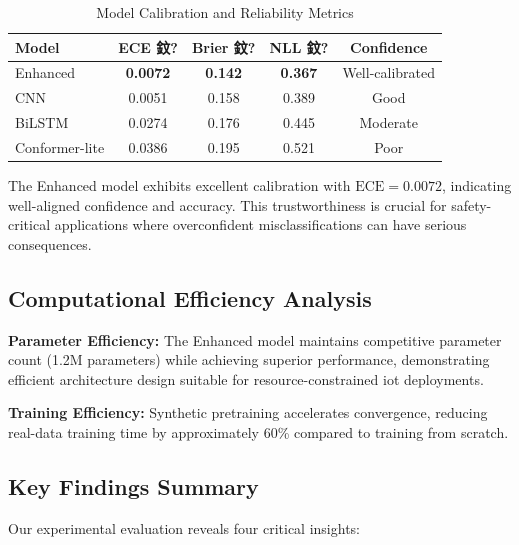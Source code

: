 \documentclass[journal]{IEEEtran}
\begin{document}
\begin{table}[ht]
\centering
\caption{Model Calibration and Reliability Metrics}
\begin{tabular}{@{}lcccc@{}}
\toprule
Model & ECE 鈫?& Brier 鈫?& NLL 鈫?& Confidence \\
\midrule
Enhanced & \textbf{0.0072} & \textbf{0.142} & \textbf{0.367} & Well-calibrated \\
CNN & 0.0051 & 0.158 & 0.389 & Good \\
BiLSTM & 0.0274 & 0.176 & 0.445 & Moderate \\
Conformer-lite & 0.0386 & 0.195 & 0.521 & Poor \\
\bottomrule
\end{tabular}
\label{tab:calibration}
\end{table}

The Enhanced model exhibits excellent calibration with $\text{ECE}=0.0072$, indicating well-aligned confidence and accuracy. This trustworthiness is crucial for safety-critical applications where overconfident misclassifications can have serious consequences.

\subsection{Computational Efficiency Analysis}

\textbf{Parameter Efficiency:} The Enhanced model maintains competitive parameter count (1.2M parameters) while achieving superior performance, demonstrating efficient architecture design suitable for resource-constrained \gls{iot} deployments.

\textbf{Training Efficiency:} Synthetic pretraining accelerates convergence, reducing real-data training time by approximately 60\% compared to training from scratch.

\subsection{Key Findings Summary}

Our experimental evaluation reveals four critical insights:
\end{document}
